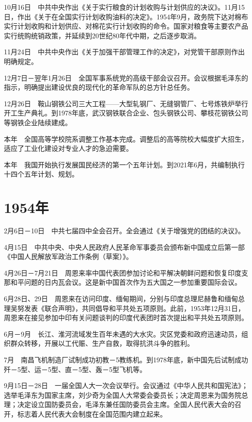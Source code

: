 \documentclass[10pt,a4paper,twocolumn]{book}
\begin{document}
10月16日　中共中央作出《关于实行粮食的计划收购与计划供应的决议》。11月15日，作出《关于在全国实行计划收购油料的决定》。1954年9月，政务院下达对棉布实行计划收购和计划供应、对棉花实行计划收购的命令。国家对粮食等主要农产品实行统购统销政策，并延续到20世纪80年代中期，之后逐步取消。

11月24日　中共中央作出《关于加强干部管理工作的决定》，对党管干部原则作出明确规定。

12月7日－翌年1月26日　全国军事系统党的高级干部会议召开。会议根据毛泽东的指示，明确提出建设优良的现代化的革命军队的总方针总任务。

12月26日　鞍山钢铁公司三大工程——大型轧钢厂、无缝钢管厂、七号炼铁炉举行开工生产典礼。到1978年底，武汉钢铁联合企业、包头钢铁公司、攀枝花钢铁公司等钢铁企业陆续建成。

本年　全国高等学校院系调整工作基本完成。调整后的高等院校大幅度扩大招生，适应了工业化建设对专业人才的急迫需要。

本年　我国开始执行发展国民经济的第一个五年计划。到2021年6月，共编制执行十四个五年计划、规划。

\section{1954年}

2月6日－10日　中共七届四中全会召开。全会通过《关于增强党的团结的决议》。

4月15日　中共中央、中央人民政府人民革命军事委员会颁布新中国成立后第一部《中国人民解放军政治工作条例（草案）》。

4月26日－7月21日　周恩来率中国代表团参加讨论和平解决朝鲜问题和恢复印度支那和平问题的日内瓦会议。这是新中国首次作为五大国之一参加重要国际会议。

6月28日、29日　周恩来在访问印度、缅甸期间，分别与印度总理尼赫鲁和缅甸总理吴努发表《联合声明》，共同倡导和平共处五项原则。此前，1953年12月31日，周恩来在接见参加中印有关问题谈判的印度代表团时首次提出和平共处五项原则。

6月－9月　长江、淮河流域发生百年未遇的大水灾。灾区党委和政府迅速动员，组织群众转移，开展以工代赈、生产自救，取得抗洪斗争的胜利。

7月　南昌飞机制造厂试制成功初教－5教练机。到1978年底，新中国先后试制成功歼－5型、运－5型、直－5型、轰－5型飞机等。

9月15日－28日　一届全国人大一次会议举行。会议通过《中华人民共和国宪法》；选举毛泽东为国家主席，刘少奇为全国人大常委会委员长；决定周恩来为国务院总理；决定设立国防委员会，毛泽东兼任国防委员会主席。全国人民代表大会的召开，标志着人民代表大会制度在全国范围内建立起来。
\end{document}
